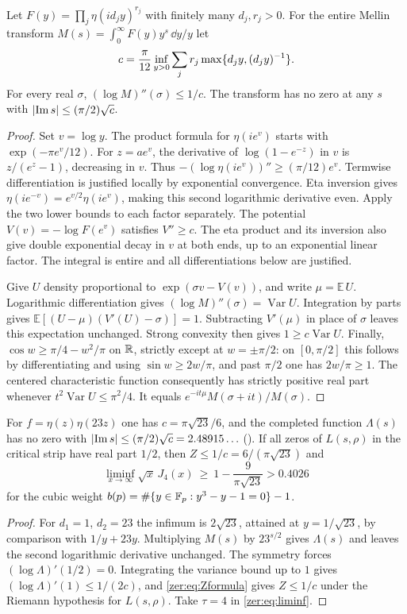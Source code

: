 \begin{proposition}[\stU]\label{zer:prop:eta}
Let $F(y)=\prod_j\eta(id_jy)^{r_j}$ with finitely many $d_j,r_j>0$. For the entire Mellin
transform $M(s)=\int_0^\infty F(y)y^s\,\dd y/y$ let
\[
 c=\frac\pi{12}\inf_{y>0}\sum_jr_j\max\{d_jy,(d_jy)^{-1}\}.
\]
For every real $\sigma$, $(\log M)''(\sigma)\le1/c$. The transform has no zero at any $s$
with $\lvert\operatorname{Im} s\rvert\le(\pi/2)\sqrt c$.
\end{proposition}
\begin{proof}
Set $v=\log y$. The product formula for $\eta(ie^v)$ starts with $\exp(-\pi e^v/12)$. For
$z=ae^v$, the derivative of $\log(1-e^{-z})$ in $v$ is $z/(e^z-1)$, decreasing in $v$. Thus
$-(\log\eta(ie^v))''\ge(\pi/12)e^v$. Termwise differentiation is justified locally by
exponential convergence. Eta inversion gives $\eta(ie^{-v})=e^{v/2}\eta(ie^v)$, making this
second logarithmic derivative even. Apply the two lower bounds to each factor separately.
The potential $V(v)=-\log F(e^v)$ satisfies $V''\ge c$. The eta product and its inversion
also give double exponential decay in $v$ at both ends, up to an exponential linear factor.
The integral is entire and all differentiations below are justified.

Give $U$ density proportional to $\exp(\sigma v-V(v))$, and write $\mu=\mathbb E\,U$.
Logarithmic differentiation gives $(\log M)''(\sigma)=\operatorname{Var}U$. Integration by
parts gives $\mathbb E[(U-\mu)(V'(U)-\sigma)]=1$. Subtracting $V'(\mu)$ in place of $\sigma$
leaves this expectation unchanged. Strong convexity then gives $1\ge c\operatorname{Var}U$.
Finally, $\cos w\ge\pi/4-w^2/\pi$ on $\mathbb{R}$, strictly except at $w=\pm\pi/2$: on $[0,\pi/2]$
this follows by differentiating and using $\sin w\ge2w/\pi$, and past $\pi/2$ one has
$2w/\pi\ge1$. The centered characteristic function consequently has strictly positive real
part whenever $t^2\operatorname{Var}U\le\pi^2/4$. It equals
$e^{-it\mu}M(\sigma+it)/M(\sigma)$.
\end{proof}

\begin{corollary}\label{zer:cor:cubicZ}
For $f=\eta(z)\eta(23z)$ one has $c=\pi\sqrt{23}/6$, and the completed function
$\Lambda(s)$ has no zero with $\lvert\operatorname{Im} s\rvert\le(\pi/2)\sqrt c=2.48915\ldots$ \textup{(\stU)}.
If all zeros of $L(s,\rho)$ in the critical strip have real part $1/2$, then
$Z\le1/c=6/(\pi\sqrt{23})$ and
\[
 \liminf_{x\to\infty}\sqrt x\,J_4(x)\ \ge\ 1-\frac9{\pi\sqrt{23}}>0.4026
\]
for the cubic weight $b(p)=\#\{y\in\mathbb{F}_p:y^3-y-1=0\}-1$.
\end{corollary}
\begin{proof}
For $d_1=1$, $d_2=23$ the infimum is $2\sqrt{23}$, attained at $y=1/\sqrt{23}$, by
comparison with $1/y+23y$. Multiplying $M(s)$ by $23^{s/2}$ gives $\Lambda(s)$ and leaves
the second logarithmic derivative unchanged. The symmetry forces $(\log\Lambda)'(1/2)=0$.
Integrating the variance bound up to $1$ gives $(\log\Lambda)'(1)\le1/(2c)$, and
\eqref{zer:eq:Zformula} gives $Z\le1/c$ under the Riemann hypothesis for $L(s,\rho)$. Take
$\tau=4$ in \eqref{zer:eq:liminf}.
\end{proof}

